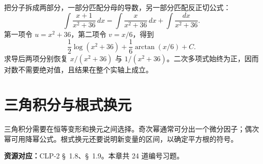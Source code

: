 \documentclass[12pt,fontset=fandol]{ctexart}
\begin{document}
\begin{solve}\label{ans:c13q24}
把分子拆成两部分，一部分匹配分母的导数，另一部分匹配反正切公式：
\[
\int\frac{x+1}{x^2+36}\,dx=\int\frac{x}{x^2+36}\,dx+\int\frac{dx}{x^2+36}.
\]
第一项令 $u=x^2+36$，第二项令 $v=x/6$，得到
\[
\frac12\log(x^2+36)+\frac{1}{6}\arctan(x/6)+C.
\]
求导后两项分别恢复 $x/(x^2+36)$ 与 $1/(x^2+36)$。二次多项式始终为正，因而对数不需要绝对值，且结果在整个实轴上成立。
\end{solve}

\clearpage
\section{三角积分与根式换元}\label{sec:ch14}
三角积分需要在恒等变形和换元之间选择。奇次幂通常可分出一个微分因子；偶次幂可用降幂公式。根式换元还要说明新变量的区间，以确定平方根的符号。

\textbf{资源对应：}CLP-2 \S~1.8、\S~1.9。本章共 24 道编号习题。
\end{document}
